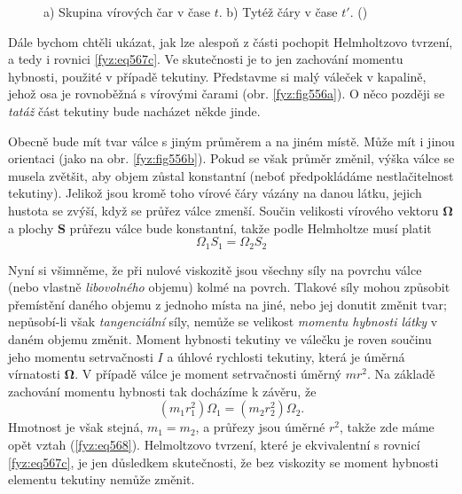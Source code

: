     \begin{figure}[ht!]
      \centering
      \caption{a) Skupina vírových čar v čase \(t\). b) Tytéž čáry v čase \(t'\).
               (\cite[s.~755]{Feynman02})}
    \end{figure}

    Dále bychom chtěli ukázat, jak lze alespoň z části pochopit Helmholtzovo tvrzení, a tedy i 
    rovnici \ref{fyz:eq567c}. Ve skutečnosti je to jen zachování momentu hybnosti, použité v 
    případě tekutiny. Představme si malý váleček v kapalině, jehož osa je rovnoběžná s vírovými 
    čarami (obr. \ref{fyz:fig556a}). O něco později se \emph{tatáž} část tekutiny bude nacházet 
    někde jinde. 
    
    Obecně bude mít tvar válce s jiným průměrem a na jiném místě. Může mít i jinou orientaci (jako 
    na obr. \ref{fyz:fig556b}). Pokud se však průměr změnil, výška válce se musela 
    zvětšit, aby objem zůstal konstantní (neboť předpokládáme nestlačitelnost tekutiny). Jelikož 
    jsou kromě toho vírové čáry vázány na danou látku, jejich hustota se zvýší, když se průřez 
    válce zmenší. Součin velikosti vírového vektoru \(\symbf{\Omega}\) a plochy \(\bm{S}\) průřezu 
    válce bude konstantní, takže podle Helmholtze musí platit
    \begin{equation}\label{fyz:eq568}
      \Omega_1S_1 = \Omega_2S_2
    \end{equation}
    
    Nyní si všimněme, že při nulové viskozitě jsou všechny síly na povrchu válce (nebo vlastně 
    \emph{libovolného} objemu) kolmé na povrch. Tlakové síly mohou způsobit přemístění daného 
    objemu z jednoho místa na jiné, nebo jej donutit změnit tvar; nepůsobí-li však 
    \emph{tangenciální} síly, nemůže se velikost \emph{momentu hybnosti látky} v daném objemu 
    změnit. Moment hybnosti tekutiny ve válečku je roven součinu jeho momentu setrvačnosti \(I\) a 
    úhlové rychlosti tekutiny, která je úměrná vírnatosti \(\symbf{\Omega}\). V případě válce je 
    moment setrvačnosti úměrný \(mr^2\). Na základě zachování momentu hybnosti tak docházíme k 
    závěru, že
    \begin{equation*}
      (m_1r_1^2)\Omega_1 = (m_2r_2^2)\Omega_2.
    \end{equation*}
    Hmotnost je však stejná, \(m_1 = m_2\), a průřezy jsou úměrné \(r^2\), takže zde máme opět 
    vztah (\ref{fyz:eq568}). Helmoltzovo tvrzení, které je ekvivalentní s rovnicí \ref{fyz:eq567c}, 
    je jen důsledkem skutečnosti, že bez viskozity se moment hybnosti elementu tekutiny nemůže 
    změnit.
    
